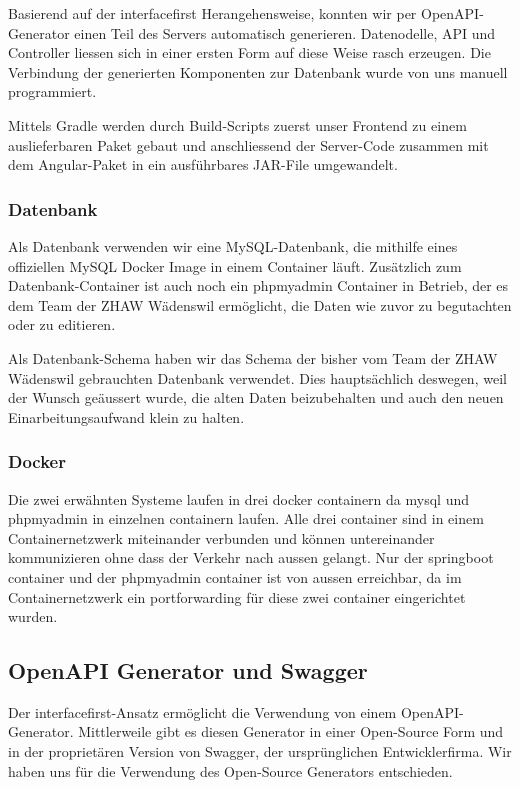\documentclass[../main.tex]{subfiles}
\begin{document}
	\noindent Basierend auf der \gls{interfacefirst} Herangehensweise, konnten wir per OpenAPI-Generator einen Teil des Servers automatisch generieren. Datenodelle, API und Controller liessen sich in einer ersten Form auf diese Weise rasch erzeugen. Die Verbindung der generierten Komponenten zur Datenbank wurde von uns manuell programmiert.
	
	\noindent Mittels Gradle werden durch Build-Scripts zuerst unser Frontend zu einem auslieferbaren Paket gebaut und anschliessend der Server-Code zusammen mit dem Angular-Paket in ein ausführbares JAR-File umgewandelt.
	
	\subsubsection{Datenbank}
	Als Datenbank verwenden wir eine MySQL-Datenbank, die mithilfe eines offiziellen MySQL Docker Image in einem Container läuft. Zusätzlich zum Datenbank-Container ist auch noch ein \gls{phpmyadmin} Container in Betrieb, der es dem Team der ZHAW Wädenswil ermöglicht, die Daten wie zuvor zu begutachten oder zu editieren.
	
	\noindent Als Datenbank-Schema haben wir das Schema der bisher vom Team der ZHAW Wädenswil gebrauchten Datenbank verwendet. Dies hauptsächlich deswegen, weil der Wunsch geäussert wurde, die alten Daten beizubehalten und auch den neuen Einarbeitungsaufwand klein zu halten.
	
	\subsubsection{Docker}
	Die zwei erwähnten Systeme laufen in drei \gls{docker} \gls{container}n da \gls{mysql} und \gls{phpmyadmin} in einzelnen \gls{container}n laufen. Alle drei \gls{container} sind in einem Containernetzwerk miteinander verbunden und können untereinander kommunizieren ohne dass der Verkehr nach aussen gelangt. Nur der \gls{springboot} \gls{container} und der \gls{phpmyadmin} \gls{container} ist von aussen erreichbar, da im Containernetzwerk ein \gls{portforwarding} für diese zwei \gls{container} eingerichtet wurden.
	
	\subsection{OpenAPI Generator und Swagger}
	Der \gls{interfacefirst}-Ansatz ermöglicht die Verwendung von einem OpenAPI-Generator. Mittlerweile gibt es diesen Generator in einer Open-Source Form und in der proprietären Version von Swagger, der ursprünglichen Entwicklerfirma. Wir haben uns für die Verwendung des Open-Source Generators entschieden.
	
\end{document}
